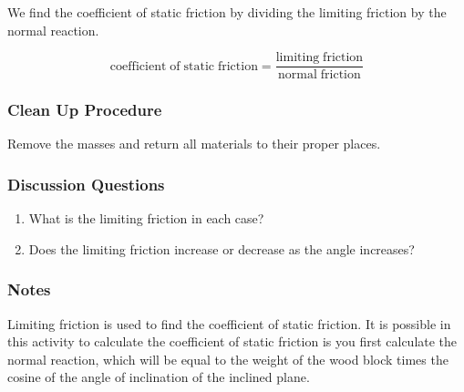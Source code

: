 We find the coefficient of static friction by dividing the limiting friction by the normal reaction.

\begin{center}
$$ \mathrm{coefficient \;of \;static \;friction} = \frac{\mathrm{limiting \;friction}}{\mathrm{normal \;friction}} $$
\end{center}

\subsubsection*{Clean Up Procedure}
Remove the masses and return all materials to their proper places.

\subsubsection*{Discussion Questions}
\begin{enumerate}
\item{What is the limiting friction in each case?}
\item{Does the limiting friction increase or decrease as the angle increases?}
\end{enumerate}

\subsubsection*{Notes}
Limiting friction is used to find the coefficient of static friction. It is possible in this activity to calculate the coefficient of static friction is you first calculate the normal reaction, which will be equal to the weight of the wood block times the cosine of the angle of inclination of the inclined plane.
